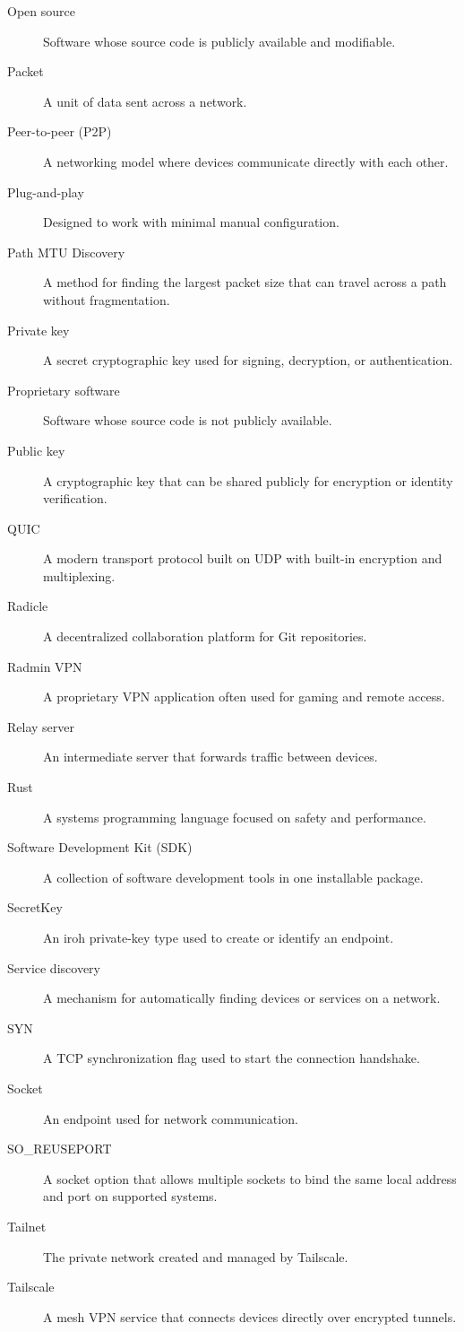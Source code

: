 \documentclass[a4paper, 10pt]{article}
\begin{document}
\begin{description}
  \item[Open source] Software whose source code is publicly available and modifiable.
  \item[Packet] A unit of data sent across a network.
  \item[Peer-to-peer (P2P)] A networking model where devices communicate directly with each other.
  \item[Plug-and-play] Designed to work with minimal manual configuration.
  \item[Path MTU Discovery] A method for finding the largest packet size that can travel across a path without fragmentation.
  \item[Private key] A secret cryptographic key used for signing, decryption, or authentication.
  \item[Proprietary software] Software whose source code is not publicly available.
  \item[Public key] A cryptographic key that can be shared publicly for encryption or identity verification.
  \item[QUIC] A modern transport protocol built on UDP with built-in encryption and multiplexing.
  \item[Radicle] A decentralized collaboration platform for Git repositories.
  \item[Radmin VPN] A proprietary VPN application often used for gaming and remote access.
  \item[Relay server] An intermediate server that forwards traffic between devices.
  \item[Rust] A systems programming language focused on safety and performance.
  \item[Software Development Kit (SDK)] A collection of software development tools in one installable package.
  \item[SecretKey] An iroh private-key type used to create or identify an endpoint.
  \item[Service discovery] A mechanism for automatically finding devices or services on a network.
  \item[SYN] A TCP synchronization flag used to start the connection handshake.
  \item[Socket] An endpoint used for network communication.
  \item[SO\_REUSEPORT] A socket option that allows multiple sockets to bind the same local address and port on supported systems.
  \item[Tailnet] The private network created and managed by Tailscale.
  \item[Tailscale] A mesh VPN service that connects devices directly over encrypted tunnels.

\end{description}
\end{document}
